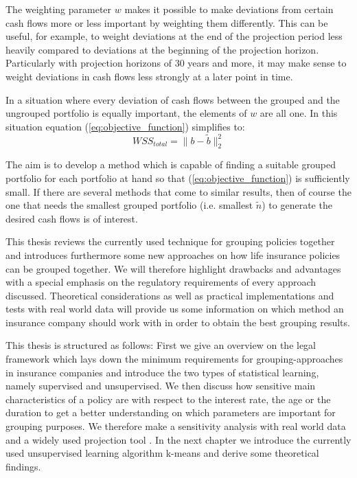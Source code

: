 The weighting parameter $w$ makes it possible to make deviations from certain cash flows more or less important by weighting them differently. This can be useful, for example, to weight deviations at the end of the projection period less heavily compared to deviations at the beginning of the projection horizon. Particularly with projection horizons of 30 years and more, it may make sense to weight deviations in cash flows less strongly at a later point in time. 

\begin{remark}
	In a situation where every deviation of cash flows between the grouped and the ungrouped portfolio is equally important, the elements of $w$ are all one. In this situation equation (\ref{eq:objective_function}) simplifies to:	
	\begin{equation}\label{eq:objective_function_simple}
		WSS_{total} = \lVert b - \tilde{b}\lVert_2^2
	\end{equation}	
\end{remark}

The aim is to develop a method which is capable of finding a suitable grouped portfolio for each portfolio at hand so that (\ref{eq:objective_function}) is sufficiently small. If there are several methods that come to similar results, then of course the one that needs the smallest grouped portfolio (i.e. smallest $\tilde{n}$) to generate the desired cash flows is of interest. 


This thesis reviews the currently used technique for grouping policies together and introduces furthermore some new approaches on how life insurance policies can be grouped together. We will therefore highlight drawbacks and advantages with a special emphasis on the regulatory requirements of every approach discussed. Theoretical considerations as well as practical implementations and tests with real world data will provide us some information on which method an insurance company should work with in order to obtain the best grouping results.  

This thesis is structured as follows: First we give an overview on the legal framework which lays down the minimum requirements for grouping-approaches in insurance companies and introduce the two types of statistical learning, namely supervised and unsupervised. We then discuss how sensitive main characteristics of a policy are with respect to the interest rate, the age or the duration to get a better understanding on which parameters are important for grouping purposes. We therefore make a sensitivity analysis with real world data and a widely used projection tool . In the next chapter we introduce the currently used unsupervised learning algorithm k-means and derive some theoretical findings. 


